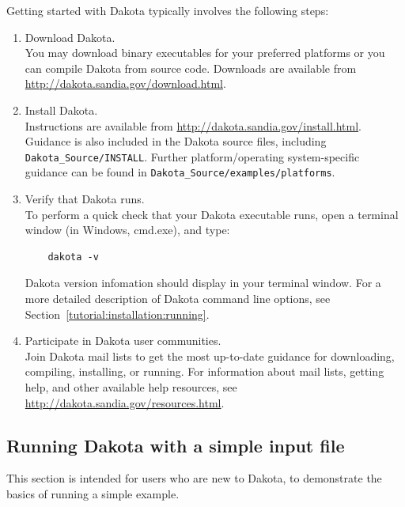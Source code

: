Getting started with Dakota typically involves the following steps:
\begin{enumerate}
  \item Download Dakota. \\
    You may download binary executables for your preferred platforms or 
    you can compile Dakota from source code. Downloads are available from 
    \url{http://dakota.sandia.gov/download.html}.
    
  \item Install Dakota. \\
    Instructions are available from 
    \url{http://dakota.sandia.gov/install.html}. Guidance is also 
    included in the Dakota source files, including
    \texttt{Dakota\_Source/INSTALL}. Further platform/operating system-specific
    guidance can be found in {\tt Dakota\_Source/examples/platforms}.

  \item Verify that Dakota runs. \\
    To perform a quick check that your Dakota executable runs, open a 
    terminal window (in Windows, cmd.exe), and type: \\
    \vspace{-2em}
    \begin{small}
    \begin{verbatim}
    dakota -v
    \end{verbatim}
      \end{small}
    \vspace{-2em}
    Dakota version infomation should display in your terminal window.
    For a more detailed description of Dakota command line options, see
    Section~\ref{tutorial:installation:running}.

  \item Participate in Dakota user communities. \\
    Join Dakota mail lists to get the most up-to-date guidance for
    downloading, compiling, installing, or running. For information about
    mail lists, getting help, and other available help resources, see \\
    \url{http://dakota.sandia.gov/resources.html}.

\end{enumerate}

\subsection{Running Dakota with a simple input file}\label{tutorial:quickstart:running}
This section is intended for users who are new to Dakota, to demonstrate the basics 
of running a simple example. 


